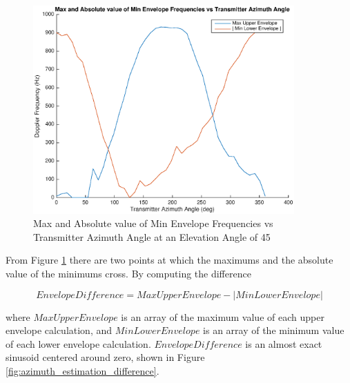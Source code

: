 \begin{figure}
	\begin{center}
		\includegraphics[width=10cm]{images/results/Azimuth_angle_estimation_max_vs_absMin.eps}
		\caption{Max and Absolute value of Min Envelope Frequencies vs Transmitter Azimuth Angle at an Elevation Angle of 45\textdegree}
		\label{fig:azimuth_estimation_max_vs_absMin}
	\end{center}
\end{figure}

From Figure \ref{fig:azimuth_estimation_max_vs_absMin} there are two points at which the maximums and the absolute value of the minimums cross. By computing the difference

\begin{equation}
	 Envelope Difference = Max Upper Envelope - | Min Lower Envelope |
	 \label{eqn:difference}
\end{equation}

where $Max Upper Envelope$ is an array of the maximum value of each upper envelope calculation, and $Min Lower Envelope$ is an array of the minimum value of each lower envelope calculation. $Envelope Difference$ is an almost exact sinusoid centered around zero, shown in Figure \ref{fig:azimuth_estimation_difference}.

